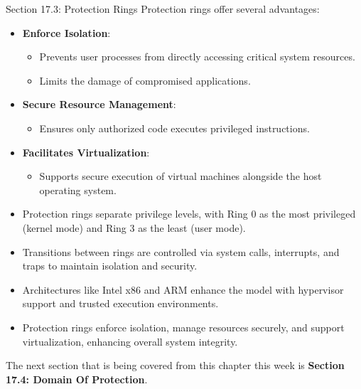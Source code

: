 \begin{notes}{Section 17.3: Protection Rings}
    Protection rings offer several advantages:
    \begin{itemize}
        \item \textbf{Enforce Isolation}:
        \begin{itemize}
            \item Prevents user processes from directly accessing critical system resources.
            \item Limits the damage of compromised applications.
        \end{itemize}
        \item \textbf{Secure Resource Management}:
        \begin{itemize}
            \item Ensures only authorized code executes privileged instructions.
        \end{itemize}
        \item \textbf{Facilitates Virtualization}:
        \begin{itemize}
            \item Supports secure execution of virtual machines alongside the host operating system.
        \end{itemize}
    \end{itemize}
    
    \begin{highlight}
        \begin{itemize}
            \item Protection rings separate privilege levels, with Ring 0 as the most privileged (kernel mode) and Ring 3 as the least (user mode).
            \item Transitions between rings are controlled via system calls, interrupts, and traps to maintain isolation and security.
            \item Architectures like Intel x86 and ARM enhance the model with hypervisor support and trusted execution environments.
            \item Protection rings enforce isolation, manage resources securely, and support virtualization, enhancing overall system integrity.
        \end{itemize}
    \end{highlight}
\end{notes}

The next section that is being covered from this chapter this week is \textbf{Section 17.4: Domain Of Protection}.

